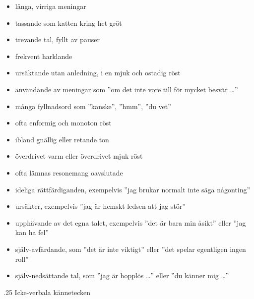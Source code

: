 \documentclass[swedish,a4paper]{book}
\makeatletter
\renewcommand\subsection{\@startsection{subsection}{1}{\z@}%
                                   {\baselineskip}%
                                   {.25\baselineskip}%
                                   {\fontsize{1\baselineskip}{1.25\baselineskip}\selectfont\sffamily\bfseries}} %
\makeatother
\begin{document}
\begin{itemize}

\item långa, virriga meningar

\item tassande som katten kring het gröt

\item trevande tal, fyllt av pauser

\item frekvent harklande

\item ursäktande utan anledning, i en mjuk och ostadig röst

\item användande av meningar som ''om det inte vore till för mycket besvär \ldots{}''

\item många fyllnadsord som ''kanske'', ''hmm'', ''du vet''

\item ofta enformig och monoton röst

\item ibland gnällig eller retande ton

\item överdrivet varm eller överdrivet mjuk röst

\item ofta lämnas resonemang oavslutade

\item ideliga rättfärdiganden, exempelvis ''jag brukar normalt inte säga någonting''

\item ursäkter, exempelvis ''jag är hemskt ledsen att jag stör''

\item upphävande av det egna talet, exempelvis ''det är bara min åsikt'' eller ''jag kan ha fel''

\item själv-avfärdande, som ''det är inte viktigt'' eller ''det spelar egentligen ingen roll''

\item själv-nedsättande tal, som ''jag är hopplös \ldots{}'' eller ''du känner mig \ldots{}''

\end{itemize}

\subsection{Icke-verbala kännetecken}
\end{document}
